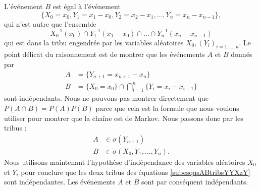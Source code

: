L'événement \( B\) est égal à l'événement
\begin{equation}
    \{ X_0=x_0,Y_1=x_1-x_0,Y_2=x_2-x_1,\ldots,Y_n=x_n-x_{n-1} \},
\end{equation}
qui n'est autre que l'ensemble
\begin{equation}
    X_0^{-1}(x_0)\cap Y_1^{-1}(x_1-x_0)\cap\ldots\cap Y_{n}^{-1}(x_n-x_{n-1})
\end{equation}
qui est dans la tribu engendrée par les variables aléatoires \( X_0,(Y_i)_{i=1,\ldots,n}\). Le point délicat du raisonnement est de montrer que les événements \( A\) et \( B\) donnés par
\begin{subequations}
    \begin{align}
        A&=\{ Y_{n+1}=x_{n+1}-x_n \}\\
        B&=\{ X_0=x_0 \}\cap\bigcap_{i=1}^n \{ Y_i=x_i-x_{i-1}\}
    \end{align}
\end{subequations}
sont indépendants. Nous ne pouvons pas montrer directement que \( P(A\cap B)=P(A)P(B)\) parce que cela est la formule que nous voulons utiliser pour montrer que la chaîne est de Markov. Nous passons donc par les tribus :
\begin{subequations}        \label{subesqqsABtribsYYXzY}
    \begin{align}
        A&\in\sigma(Y_{n+1})\\
        B&\in\sigma(X_0,Y_1,\ldots,Y_n).
    \end{align}
\end{subequations}
Nous utilisons maintenant l'hypothèse d'indépendance des variables aléatoires \( X_0\) et \( Y_i\) pour conclure que les deux tribus des équations \eqref{subesqqsABtribsYYXzY} sont indépendantes. Les événements \( A\) et \( B\) sont par conséquent indépendants. 

